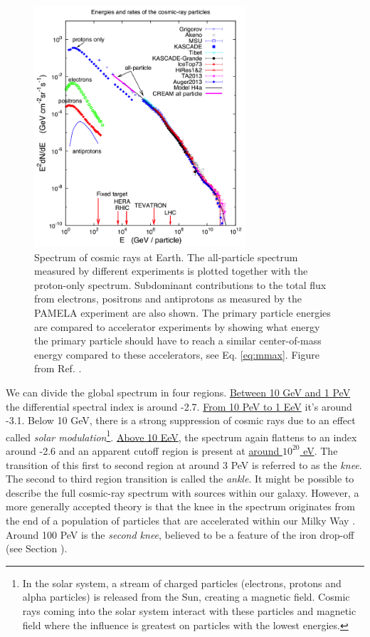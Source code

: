 \begin{figure}
\centering
\includegraphics[width = 0.7\textwidth]{chapter3/img/spectrumCR.png}
\caption{Spectrum of cosmic rays at Earth. The all-particle spectrum measured by different experiments is plotted together with the proton-only spectrum. Subdominant contributions to the total flux from electrons, positrons and antiprotons as measured by the PAMELA experiment are also shown. The primary particle energies are compared to accelerator experiments by showing what energy the primary particle should have to reach a similar center-of-mass energy compared to these accelerators, see Eq. \ref{eq:mmax}. Figure from Ref. \cite{Blasi:2013rva}.}
\label{fig:spectrumCR}
\end{figure}

We can divide the global spectrum in four regions. \underline{Between 10 GeV and 1 PeV} the differential spectral index is around -2.7. \underline{From 10 PeV to 1 EeV} it's around -3.1. Below 10 GeV, there is a strong suppression of cosmic rays due to an effect called \textit{solar modulation}\footnote{In the solar system, a stream of charged particles (electrons, protons and alpha particles) is released from the Sun, creating a magnetic field. Cosmic rays coming into the solar system interact with these particles and magnetic field where the influence is greatest on particles with the lowest energies.}. \underline{Above 10 EeV}, the spectrum again flattens to an index around -2.6 and an apparent cutoff region is present at  \underline{around $10^{20}$ eV}. The transition of this first to second region at around 3 PeV is referred to as the \textit{knee}. The second to third region transition is called the \textit{ankle}. It might be possible to describe the full cosmic-ray spectrum with sources within our galaxy. However, a more generally accepted theory is that the knee in the spectrum originates from the end of a population of particles that are accelerated within our Milky Way \cite{Gaisser:2013bla}. Around 100 PeV is the \textit{second knee}, believed to be a feature of the iron drop-off (see Section \cite{subsubsec:galactic}).

